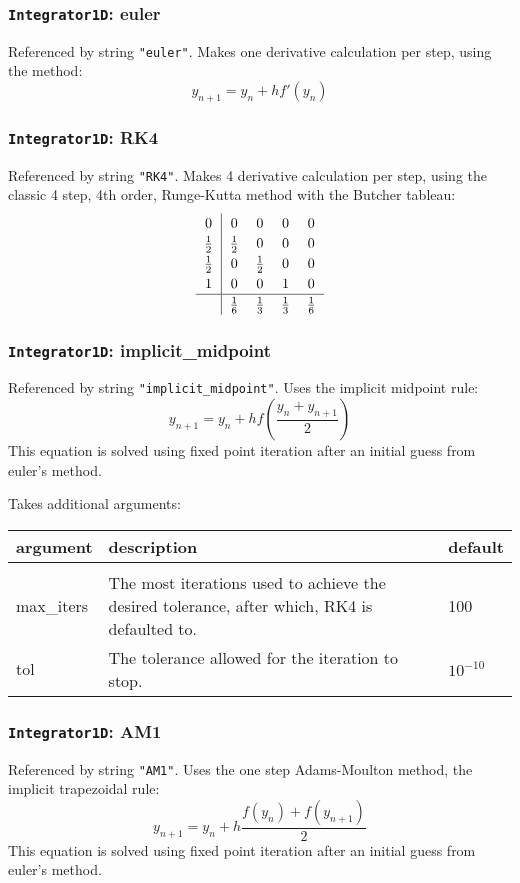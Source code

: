 \documentclass[10pt,a4paper]{article}
\newenvironment{optarglist}
    {\begin{center}
    \begin{tabular}{l|p{10cm}|l}
    argument & description & default\\
    \hline\\
    }
    { 
    \end{tabular} 
    \end{center}
    }
\begin{document}
\subsubsection{\texttt{Integrator1D}: euler}
Referenced by string \texttt{"euler"}. Makes one derivative calculation per step, using the method:
$$y_{n+1} =  y_{n} + hf'(y_{n})$$




\subsubsection{\texttt{Integrator1D}: RK4}
Referenced by string \texttt{"RK4"}. Makes 4 derivative calculation per step, using the classic 4 step, 4th order, Runge-Kutta method with the Butcher tableau:
\[\arraycolsep=6pt\def\arraystretch{1.2}\begin{array}{c|cccc}
0 & 0 & 0 & 0 & 0\\
\frac12 & \frac12 & 0 & 0 & 0\\
\frac12 & 0 & \frac12 & 0 & 0\\
1 & 0 & 0 & 1 & 0\\
\hline
&\frac16 & \frac13 & \frac13 & \frac16
\end{array}
\]



\subsubsection{\texttt{Integrator1D}: implicit\_midpoint}
Referenced by string \texttt{"implicit\_midpoint"}. Uses the implicit midpoint rule:
$$y_{n+1} = y_n + hf\left(\frac{y_n + y_{n+1}}{2}\right)$$
This equation is solved using fixed point iteration after an initial guess from euler's method.

Takes additional arguments:

\begin{optarglist}
max\_iters & The most iterations used to achieve the desired tolerance, after which, RK4 is defaulted to. & 100\\\hline
tol & The tolerance allowed for the iteration to stop. & $10^{-10}$
\end{optarglist}




\subsubsection{\texttt{Integrator1D}: AM1}
Referenced by string \texttt{"AM1"}. Uses the one step Adams-Moulton method, the implicit trapezoidal rule:
$$y_{n+1} = y_n + h\frac{f(y_n) + f(y_{n+1})}{2}$$
This equation is solved using fixed point iteration after an initial guess from euler's method.
\end{document}
